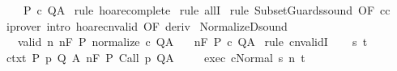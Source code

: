 \begin{isabellebody}
\ \ \ {\isachardoublequoteopen}{\isasymGamma}{\isacharcomma}{\isasymTheta}{\isasymturnstile}\isactrlbsub {\isacharslash}{\isacharbraceleft}{\isacharbraceright}\isactrlesub \ P\ c\ Q{\isacharcomma}A{\isachardoublequoteclose}\isanewline
%
\isadelimproof
%
\endisadelimproof
%
\isatagproof
{}\isamarkupfalse%
\ {\isacharparenleft}rule\ hoare{\isacharunderscore}complete{\isacharprime}{\isacharparenright}\isanewline
{}\isamarkupfalse%
\ {\isacharparenleft}rule\ allI{\isacharparenright}\isanewline
{}\isamarkupfalse%
\ {\isacharparenleft}rule\ SubsetGuards{\isacharunderscore}sound\ {\isacharbrackleft}OF\ c{\isacharunderscore}c{\isacharprime}{\isacharbrackright}{\isacharparenright}\isanewline
{}\isamarkupfalse%
\ {\isacharparenleft}iprover\ intro{\isacharcolon}\ hoare{\isacharunderscore}cnvalid\ {\isacharbrackleft}OF\ deriv{\isacharbrackright}{\isacharparenright}\isanewline
{}\isamarkupfalse%
%
\endisatagproof
{\isafoldproof}%
%
\isadelimproof
\isanewline
%
\endisadelimproof
\isanewline
{}\isamarkupfalse%
\ NormalizeD{\isacharunderscore}sound{\isacharcolon}\ \isanewline
\ \ \ valid{\isacharcolon}\ {\isachardoublequoteopen}{\isasymforall}n{\isachardot}\ {\isasymGamma}{\isacharcomma}{\isasymTheta}{\isasymTurnstile}n{\isacharcolon}\isactrlbsub {\isacharslash}F\isactrlesub \ P\ {\isacharparenleft}normalize\ c{\isacharparenright}\ Q{\isacharcomma}A{\isachardoublequoteclose}\isanewline
\ \ \ {\isachardoublequoteopen}{\isasymGamma}{\isacharcomma}{\isasymTheta}{\isasymTurnstile}n{\isacharcolon}\isactrlbsub {\isacharslash}F\isactrlesub \ P\ c\ Q{\isacharcomma}A{\isachardoublequoteclose}\isanewline
%
\isadelimproof
%
\endisadelimproof
%
\isatagproof
{}\isamarkupfalse%
\ {\isacharparenleft}rule\ cnvalidI{\isacharparenright}\isanewline
\ \ \isamarkupfalse%
\ s\ t\isanewline
\ \ \isamarkupfalse%
\ ctxt{\isacharcolon}\ {\isachardoublequoteopen}{\isasymforall}{\isacharparenleft}P{\isacharcomma}\ p{\isacharcomma}\ Q{\isacharcomma}\ A{\isacharparenright}{\isasymin}{\isasymTheta}{\isachardot}\ {\isasymGamma}{\isasymTurnstile}n{\isacharcolon}\isactrlbsub {\isacharslash}F\isactrlesub \ P\ {\isacharparenleft}Call\ p{\isacharparenright}\ Q{\isacharcomma}A{\isachardoublequoteclose}\ \isanewline
\ \ \isamarkupfalse%
\ exec{\isacharcolon}\ {\isachardoublequoteopen}{\isasymGamma}{\isasymturnstile}{\isasymlangle}c{\isacharcomma}Normal\ s{\isasymrangle}\ {\isacharequal}n{\isasymRightarrow}\ t{\isachardoublequoteclose}\ \isanewline

\end{isabellebody}

